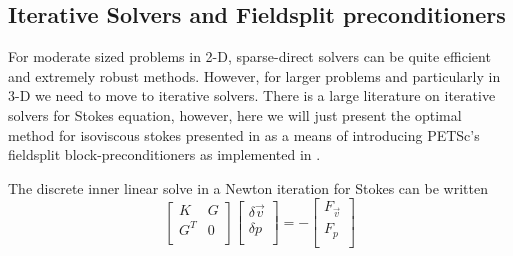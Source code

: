 \subsection{Iterative Solvers and Fieldsplit preconditioners}
\label{sec:iterative-solvers-1}

For moderate sized problems in 2-D, sparse-direct solvers can be quite
efficient and extremely robust methods.  However, for larger problems
and particularly in 3-D we need to move to iterative solvers.  There
is a large literature on iterative solvers for Stokes equation, 
however, here we will just present the optimal method for isoviscous
stokes presented in \cite{elman_finite_2005} as a means of introducing
PETSc's fieldsplit block-preconditioners as implemented in \TF{}.

The discrete inner linear solve in a Newton iteration for Stokes can
be written
\begin{equation}
  \label{eq:21}
     \left[
\begin{array}{cc}
  K & G  \\
  G^{T} & 0 \\
  \end{array}
  \right]
  \left[
    \begin{array}{c}
      \delta \vec{v} \\
      \delta p \\
    \end{array}
  \right] = -\left[
    \begin{array}{c}
      F_{\vec{v}} \\
      F_{p}\\
    \end{array}
  \right]
\end{equation}


